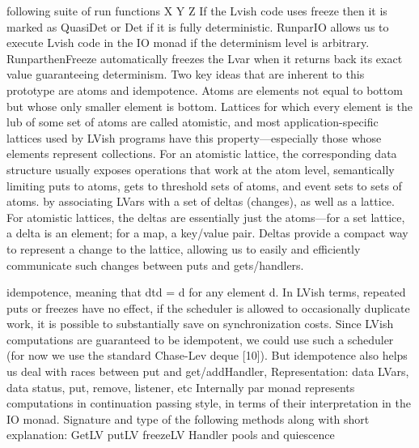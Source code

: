 \documentclass[twocolumn]{article}
\begin{document}
following suite of run functions
X
Y
Z
If the Lvish code uses freeze then it is marked as QuasiDet or Det if it is fully deterministic. RunparIO allows us to execute Lvish code in the IO monad if the determinism level is arbitrary. RunparthenFreeze automatically freezes the Lvar when it returns back its exact value guaranteeing determinism.
Two key ideas that are inherent to this prototype are atoms and idempotence. Atoms are elements not equal to bottom but whose only smaller element is bottom. Lattices for which every element is the lub of some set of atoms are called atomistic, and most application-specific lattices used by LVish programs have this property—especially those whose elements represent collections. For an atomistic lattice, the corresponding data structure usually exposes operations that work at the atom level, semantically limiting puts to atoms, gets to threshold sets of atoms, and event sets to sets of atoms.     by associating LVars with a set of deltas (changes), as well as a lattice. For atomistic lattices, the deltas are essentially just the atoms—for a set lattice, a delta is an element; for a map, a key/value pair. Deltas provide a compact way to represent a change to the lattice, allowing us to easily and efficiently communicate such changes between puts and gets/handlers.  

idempotence, meaning that dtd = d for any element d. In LVish terms, repeated puts or freezes have no effect,   if the scheduler is allowed to occasionally duplicate work, it is possible to substantially save on synchronization costs. Since LVish computations are guaranteed to be idempotent, we could use such a scheduler (for now we use the standard Chase-Lev deque [10]). But idempotence also helps us deal with races between put and get/addHandler, 
Representation: data LVars, data status, put, remove, listener, etc 
Internally par monad represents computations in continuation passing style, in terms of their interpretation in the IO monad. 
Signature and type of the following methods along with short explanation:
GetLV
putLV
freezeLV
Handler pools and quiescence
\end{document}
